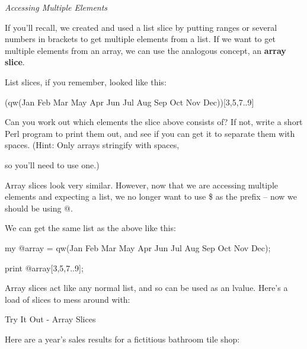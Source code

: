 \documentclass[a4paper,11pt]{book}
\begin{document}
\noindent 

\noindent \textit{Accessing Multiple Elements}

\noindent If you'll recall, we created and used a list slice by putting ranges or several numbers in brackets to get multiple elements from a list. If we want to get multiple elements from an array, we can use the analogous concept, an \textbf{array slice}.

\noindent 

\noindent List slices, if you remember, looked like this:

\noindent 

\noindent 

\noindent (qw(Jan Feb Mar May Apr Jun Jul Aug Sep Oct Nov Dec))[3,5,7..9]

\noindent 

\noindent Can you work out which elements the slice above consists of? If not, write a short Perl program to print them out, and see if you can get it to separate them with spaces. (Hint: Only arrays stringify with spaces,

\noindent so you'll need to use one.)

\noindent 

\noindent Array slices look very similar. However, now that we are accessing multiple elements and expecting a list, we no longer want to use \$ as the prefix -- now we should be using @.

\noindent 

\noindent We can get the same list as the above like this:

\noindent 

\noindent 

\noindent my @array = qw(Jan Feb Mar May Apr Jun Jul Aug Sep Oct Nov Dec);

\noindent 

\noindent print @array[3,5,7..9];

\noindent 

\noindent Array slices act like any normal list, and so can be used as an lvalue. Here's a load of slices to mess around with:

\noindent 

\noindent 

\noindent Try It Out - Array Slices

\noindent 

\noindent 

\noindent Here are a year's sales results for a fictitious bathroom tile shop:
\end{document}
